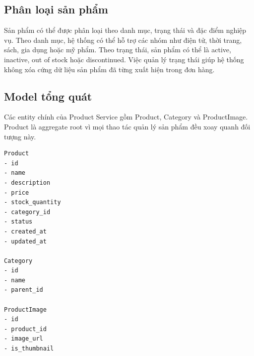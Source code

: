 \documentclass[../main.tex]{subfiles}
\begin{document}
\subsection{Phân loại sản phẩm}
\label{subsection:2.3.1}

Sản phẩm có thể được phân loại theo danh mục, trạng thái và đặc điểm nghiệp vụ. Theo danh mục, hệ thống có thể hỗ trợ các nhóm như điện tử, thời trang, sách, gia dụng hoặc mỹ phẩm. Theo trạng thái, sản phẩm có thể là active, inactive, out of stock hoặc discontinued. Việc quản lý trạng thái giúp hệ thống không xóa cứng dữ liệu sản phẩm đã từng xuất hiện trong đơn hàng.

\subsection{Model tổng quát}
\label{subsection:2.3.2}

Các entity chính của Product Service gồm Product, Category và ProductImage. Product là aggregate root vì mọi thao tác quản lý sản phẩm đều xoay quanh đối tượng này.

\begin{lstlisting}[caption={Model tổng quát của Product Service}, label={lst:chapter2-product-model}]
Product
- id
- name
- description
- price
- stock_quantity
- category_id
- status
- created_at
- updated_at

Category
- id
- name
- parent_id

ProductImage
- id
- product_id
- image_url
- is_thumbnail
\end{lstlisting}
\end{document}
